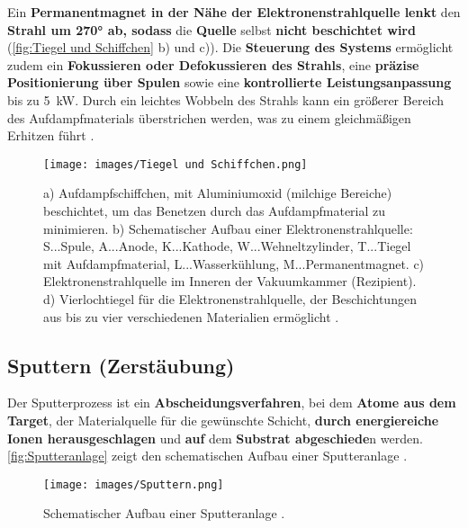 \documentclass{article} %
\begin{document}
\vspace{1em}

Ein \textbf{Permanentmagnet in der Nähe der Elektronenstrahlquelle lenkt} den \textbf{Strahl um 270° ab, sodass} die \textbf{Quelle} selbst 
\textbf{nicht beschichtet wird} (\autoref{fig:Tiegel und Schiffchen} b) und c)). Die \textbf{Steuerung des Systems} ermöglicht zudem ein 
\textbf{Fokussieren oder Defokussieren des Strahls}, eine \textbf{präzise Positionierung über Spulen} sowie eine \textbf{kontrollierte 
Leistungsanpassung} bis zu 5~kW. Durch ein leichtes Wobbeln des Strahls kann ein größerer Bereich des Aufdampfmaterials überstrichen werden, was
 zu einem gleichmäßigen Erhitzen führt \cite{keplinger2024}.

\begin{figure}[htb!]
    \centering
    \texttt{[image: images/Tiegel und Schiffchen.png]} %
    \captionsetup{labelfont=bf} %
    \caption{%
    a) Aufdampfschiffchen, mit Aluminiumoxid (milchige Bereiche) beschichtet, um das Benetzen durch das Aufdampfmaterial zu minimieren. 
    b) Schematischer Aufbau einer Elektronenstrahlquelle: S...Spule, A...Anode, K...Kathode, W...Wehneltzylinder, T...Tiegel mit 
    Aufdampfmaterial, L...Wasserkühlung, M...Permanentmagnet.  
    c) Elektronenstrahlquelle im Inneren der Vakuumkammer (Rezipient). 
    d) Vierlochtiegel für die Elektronenstrahlquelle, der Beschichtungen aus bis zu vier verschiedenen Materialien ermöglicht 
    \cite{keplinger2024}.
    }
    \label{fig:Tiegel und Schiffchen}
\end{figure}

\vspace{1em}
\subsection{Sputtern (Zerstäubung)} %

Der Sputterprozess ist ein \textbf{Abscheidungsverfahren}, bei dem \textbf{Atome aus dem Target}, der Materialquelle für die gewünschte Schicht, 
\textbf{durch energiereiche Ionen herausgeschlagen} und \textbf{auf} dem \textbf{Substrat abgeschiede}n werden. \autoref{fig:Sputteranlage}
zeigt den schematischen Aufbau einer Sputteranlage \cite{keplinger2024}.

\begin{figure}[htb!]
    \centering
    \texttt{[image: images/Sputtern.png]} %
    \captionsetup{labelfont=bf} %
    \caption{Schematischer Aufbau einer Sputteranlage \cite{keplinger2024}.}
    \label{fig:Sputteranlage}
\end{figure}
\end{document}
